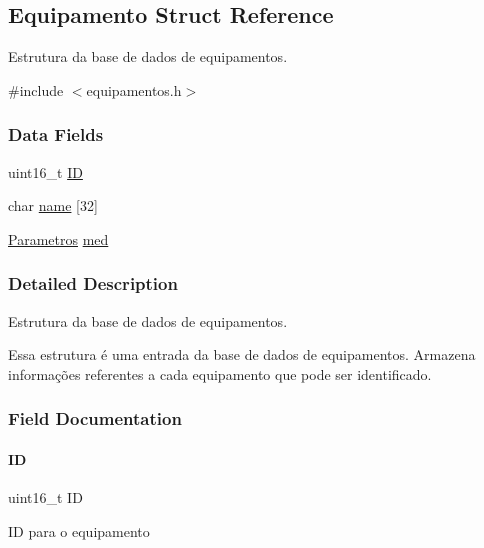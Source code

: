 \hypertarget{struct_equipamento}{}\subsection{Equipamento Struct Reference}
\label{struct_equipamento}


Estrutura da base de dados de equipamentos.  




{\ttfamily \#include $<$equipamentos.\+h$>$}

\subsubsection*{Data Fields}
\begin{DoxyCompactItemize}
\item 
uint16\+\_\+t \hyperlink{struct_equipamento_a9bb81603329def43dbb55e1ae69996d9}{ID}
\item 
char \hyperlink{struct_equipamento_abc1e86d7c344fe34ff09e72d4595ab7e}{name} \mbox{[}32\mbox{]}
\item 
\hyperlink{struct_parametros}{Parametros} \hyperlink{struct_equipamento_aa2e947ae4fcdfb65d9b7e1763b95fe4d}{med}
\end{DoxyCompactItemize}


\subsubsection{Detailed Description}
Estrutura da base de dados de equipamentos. 

Essa estrutura é uma entrada da base de dados de equipamentos. Armazena informações referentes a cada equipamento que pode ser identificado. 

\subsubsection{Field Documentation}
\mbox{\label{struct_equipamento_a9bb81603329def43dbb55e1ae69996d9}} 
\paragraph{\texorpdfstring{ID}{ID}}
{\footnotesize\ttfamily uint16\+\_\+t ID}

ID para o equipamento \mbox{\label{struct_equipamento_aa2e947ae4fcdfb65d9b7e1763b95fe4d}} 
